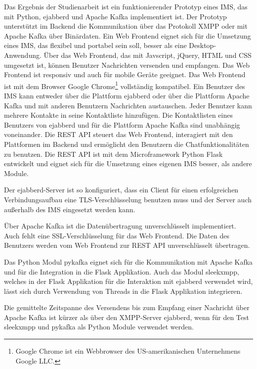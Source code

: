 \documentclass[a4paper,titlepage,halfparskip,12pt]{scrreprt}
\begin{document}
\begin{onehalfspacing}
Das Ergebnis der Studienarbeit ist ein funktionierender Prototyp eines \acs{IMS}, das mit Python, ejabberd und Apache Kafka implementiert ist. Der Prototyp unterstützt im Backend die Kommunikation über das Protokoll \acs{XMPP} oder mit Apache Kafka über Binärdaten. Ein Web Frontend eignet sich für die Umsetzung eines \acs{IMS}, das flexibel und portabel sein soll, besser als eine Desktop-Anwendung. Über das Web Frontend, das mit Javscript, jQuery, \acs{HTML} und \acs{CSS} umgesetzt ist, können Benutzer Nachrichten versenden und empfangen. Das Web Frontend ist responsiv und auch für mobile Geräte geeignet. Das Web Frontend ist mit dem Browser Google Chrome\footnote{Google Chrome ist ein Webbrowser des US-amerikanischen Unternehmens Google LLC.} vollständig kompatibel. Ein Benutzer des \acs{IMS} kann entweder über die Plattform ejabberd oder über die Plattform Apache Kafka und mit anderen Benutzern Nachrichten austauschen. Jeder Benutzer kann mehrere Kontakte in seine Kontaktliste hinzufügen. Die Kontaktlisten eines Benutzers von ejabberd und für die Plattform Apache Kafka sind unabhängig voneinander. Die \acs{REST} \acs{API} steuert das Web Frontend, interagiert mit den Plattformen im Backend und ermöglicht den Benutzern die Chatfunktionalitäten zu benutzen. Die \acs{REST} \acs{API} ist mit dem Microframework Python Flask entwickelt und eignet sich für die Umsetzung eines eigenen \acs{IMS} besser, als andere Module.

Der ejabberd-Server ist so konfiguriert, dass ein Client für einen erfolgreichen Verbindungsaufbau eine \acs{TLS}-Verschlüsselung benutzen muss und der Server auch außerhalb des \acs{IMS} eingesetzt werden kann.

Über Apache Kafka ist die Datenübertragung unverschlüsselt implementiert. Auch fehlt eine \acs{SSL}-Verschlüsselung für das Web Frontend. Die Daten des Benutzers werden vom Web Frontend zur \acs{REST} \acs{API} unverschlüsselt übertragen.

Das Python Modul pykafka eignet sich für die Kommunikation mit Apache Kafka und für die Integration in die Flask Applikation. Auch das Modul sleekxmpp, welches in der Flask Applikation für die Interaktion mit ejabberd verwendet wird, lässt sich durch Verwendung von Threads in die Flask Applikation integrieren.

Die gemittelte Zeitspanne des Versendens bis zum Empfang einer Nachricht über Apache Kafka ist kürzer als über den \acs{XMPP}-Server ejabberd, wenn für den Test sleekxmpp und pykafka als Python Module verwendet werden.


\end{onehalfspacing}
\end{document}
